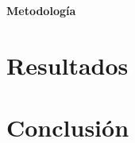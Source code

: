 \documentclass[a4paper]{article}
\begin{document}
\textbf{Metodología}\\




\section{Resultados}
%

\section{Conclusión}
\end{document}
